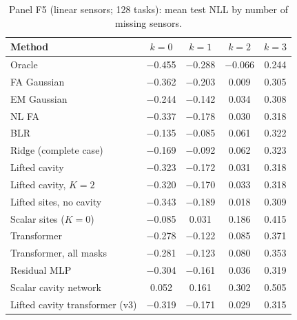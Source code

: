 \begin{table}[t]
\centering\small
\caption{\label{tab:moreF5}Panel F5 (linear sensors; 128 tasks): mean test NLL by number of missing sensors.}
\begin{tabular}{lcccc}
\toprule
Method & $k{=}0$ & $k{=}1$ & $k{=}2$ & $k{=}3$\\
\midrule
Oracle & $-$0.455 & $-$0.288 & $-$0.066 & 0.244\\
FA Gaussian & $-$0.362 & $-$0.203 & 0.009 & 0.305\\
EM Gaussian & $-$0.244 & $-$0.142 & 0.034 & 0.308\\
NL FA & $-$0.337 & $-$0.178 & 0.030 & 0.318\\
BLR & $-$0.135 & $-$0.085 & 0.061 & 0.322\\
Ridge (complete case) & $-$0.169 & $-$0.092 & 0.062 & 0.323\\
Lifted cavity & $-$0.323 & $-$0.172 & 0.031 & 0.318\\
Lifted cavity, $K=2$ & $-$0.320 & $-$0.170 & 0.033 & 0.318\\
Lifted sites, no cavity & $-$0.343 & $-$0.189 & 0.018 & 0.309\\
Scalar sites ($K=0$) & $-$0.085 & 0.031 & 0.186 & 0.415\\
Transformer & $-$0.278 & $-$0.122 & 0.085 & 0.371\\
Transformer, all masks & $-$0.281 & $-$0.123 & 0.080 & 0.353\\
Residual MLP & $-$0.304 & $-$0.161 & 0.036 & 0.319\\
Scalar cavity network & 0.052 & 0.161 & 0.302 & 0.505\\
Lifted cavity transformer (v3) & $-$0.319 & $-$0.171 & 0.029 & 0.315\\
\bottomrule
\end{tabular}
\end{table}

